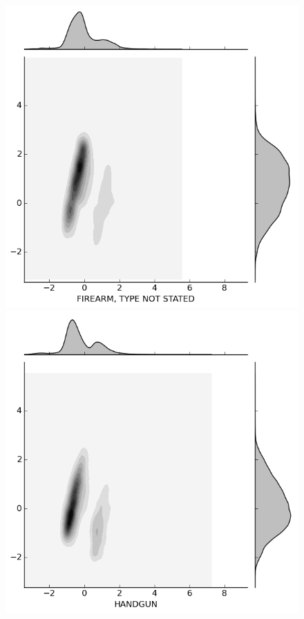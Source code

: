 \begin{figure}[H]
\begin{minipage}[b]{0.20\linewidth}
  \end{minipage}
  \quad
  \begin{minipage}[b]{0.20\linewidth}
    \includegraphics[width=\linewidth]{images/weapon/FIREARM_TYPE_NOT_STATED.png}
  \end{minipage}
  \quad
  \begin{minipage}[b]{0.20\linewidth}
    \includegraphics[width=\linewidth]{images/weapon/HANDGUN.png}
  \end{minipage}


\end{figure}
